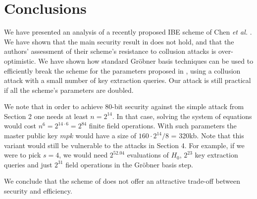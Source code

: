 \documentclass{llncs}
\begin{document}
\section{Conclusions}
We have presented an analysis of a recently proposed IBE scheme of Chen {\em et al.} \cite{CCGHC10}. We have shown that the main security result in \cite{CCGHC10} does not hold, and that the authors' assessment of their scheme's resistance to collusion attacks is over-optimistic. We have shown how standard Gr\"{o}bner basis techniques can be used to efficiently break the scheme for the parameters proposed in \cite{CCGHC10}, using a collusion attack with a small number of key extraction queries. Our attack is still practical if all the scheme's parameters are doubled.

We note that in order to achieve $80$-bit security against the simple attack from Section 2 one needs at least $n=2^{14}$. In that case, solving the system of equations would cost $n^6 = 2^{14\cdot6} = 2^{84}$ finite field operations. With such parameters the master public key $mpk$ would have a size of $160 \cdot 2^{14} / 8$ = 320kb. Note that this variant would still be vulnerable to the attacks in Section 4. For example, if we were to pick $s=4$, we would need $2^{52.04}$ evaluations of $H_0$, $2^{23}$ key extraction queries and just $2^{31}$ field operations in the Gr\"{o}bner basis step.

We conclude that the scheme of \cite{CCGHC10} does not offer an attractive trade-off between security and efficiency.
\end{document}
